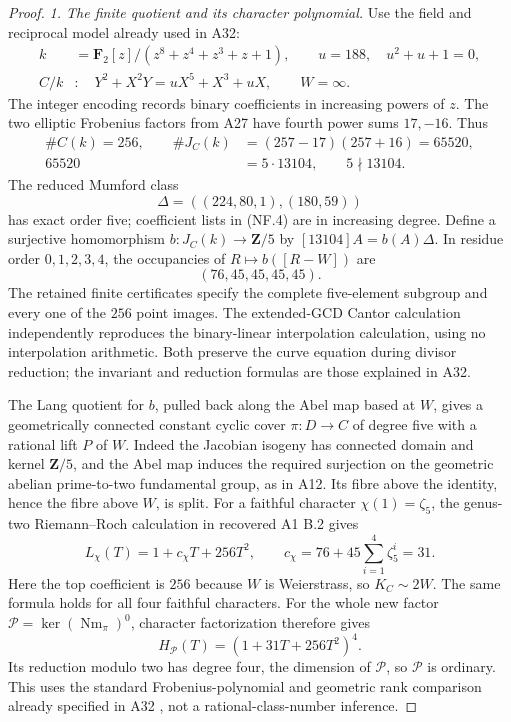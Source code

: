 \begin{proof}
\emph{1. The finite quotient and its character polynomial.}
Use the field and reciprocal model already used in A32:
\[
 \begin{split}
 k&=\mathbf F_2[z]/(z^8+z^4+z^3+z+1),\qquad u=188,\quad u^2+u+1=0,\\
 C/k&:\quad Y^2+X^2Y=uX^5+X^3+uX,\qquad W=\infty.
 \end{split}
 \tag{NF.2}
\]
The integer encoding records binary coefficients in increasing powers
of $z$. The two elliptic Frobenius factors from A27 have fourth power
sums $17,-16$. Thus
\[
 \begin{aligned}
 \#C(k)=256,
 \qquad \#J_C(k)&=(257-17)(257+16)=65520,\\
                       65520&=5\cdot13104,
                       \qquad 5\nmid13104.
 \end{aligned}
 \tag{NF.3}
\]
The reduced Mumford class
\[
 \Delta=((224,80,1),(180,59))
 \tag{NF.4}
\]
has exact order five; coefficient lists in (NF.4) are in increasing
degree. Define a surjective homomorphism
$b:J_C(k)\to\mathbf Z/5$ by
$[13104]A=b(A)\Delta$. In residue order $0,1,2,3,4$, the
occupancies of $R\mapsto b([R-W])$ are
\[
                         (76,45,45,45,45).
 \tag{NF.5}
\]
The retained finite certificates specify the complete five-element
subgroup and every one of the $256$ point images. The extended-GCD
Cantor calculation independently reproduces the binary-linear
interpolation calculation, using no interpolation arithmetic.
Both preserve the curve equation during divisor reduction; the
invariant and reduction formulas are those explained in A32.

The Lang quotient for $b$, pulled back along the Abel map based at
$W$, gives a geometrically connected constant cyclic cover
$\pi:D\to C$ of degree five with a rational lift $P$ of $W$.
Indeed the Jacobian isogeny has connected domain and kernel
$\mathbf Z/5$, and the Abel map induces the required surjection
on the geometric abelian prime-to-two fundamental group, as in A12.
Its fibre above the identity, hence the fibre above $W$, is split.
For a faithful character $\chi(1)=\zeta_5$, the genus-two
Riemann--Roch calculation in recovered A1 B.2 gives
\cite[B.2]{A1run}
\[
 L_\chi(T)=1+c_\chi T+256T^2,
 \qquad
 c_\chi=76+45\sum_{i=1}^4\zeta_5^i=31.
 \tag{NF.6}
\]
Here the top coefficient is $256$ because $W$ is Weierstrass, so
$K_C\sim2W$. The same formula holds for all four faithful
characters. For the whole new factor
$\mathcal P=\ker(\operatorname{Nm}_\pi)^0$, character
factorization therefore gives
\[
                H_{\mathcal P}(T)=(1+31T+256T^2)^4.
 \tag{NF.7}
\]
Its reduction modulo two has degree four, the dimension of
$\mathcal P$, so $\mathcal P$ is ordinary. This uses the
standard Frobenius-polynomial and geometric rank comparison
already specified in A32
\cite[Propositions~2.2.4--2.2.5]{KatzCongruence}, not a
rational-class-number inference.


\end{proof}
